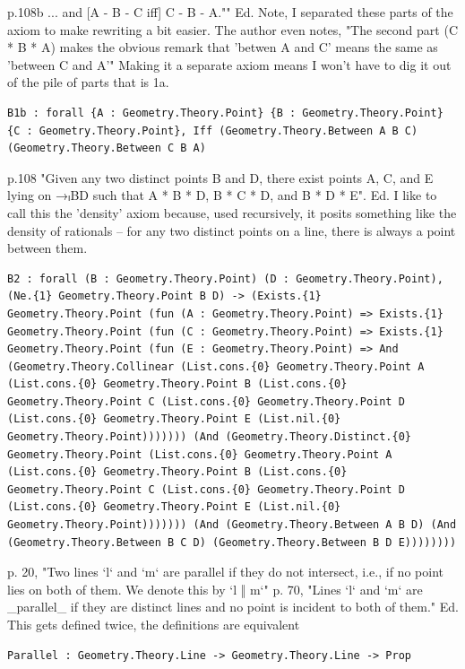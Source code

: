 \begin{lemma}
  \label{Geometry.Theory.B1b}
  \leanok
  p.108b ... and [A - B - C iff] C - B - A.""  Ed. Note, I separated these parts of the axiom to make rewriting a bit easier. The author even notes, "The second part (C * B * A) makes the obvious remark that 'betwen A and C' means the same as 'between C and A'" Making it a separate axiom means I won't have to dig it out of the pile of parts that is 1a. 
\begin{verbatim}B1b : forall {A : Geometry.Theory.Point} {B : Geometry.Theory.Point} {C : Geometry.Theory.Point}, Iff (Geometry.Theory.Between A B C) (Geometry.Theory.Between C B A)\end{verbatim}
\end{lemma}

\begin{lemma}
  \label{Geometry.Theory.B2}
  \leanok
  p.108 "Given any two distinct points B and D, there exist points A, C, and E lying on →ₗBD such that A * B * D, B * C * D, and B * D * E".  Ed. I like to call this the 'density' axiom because, used recursively, it posits something like the density of rationals -- for any two distinct points on a line, there is always a point between them. 
\begin{verbatim}B2 : forall (B : Geometry.Theory.Point) (D : Geometry.Theory.Point), (Ne.{1} Geometry.Theory.Point B D) -> (Exists.{1} Geometry.Theory.Point (fun (A : Geometry.Theory.Point) => Exists.{1} Geometry.Theory.Point (fun (C : Geometry.Theory.Point) => Exists.{1} Geometry.Theory.Point (fun (E : Geometry.Theory.Point) => And (Geometry.Theory.Collinear (List.cons.{0} Geometry.Theory.Point A (List.cons.{0} Geometry.Theory.Point B (List.cons.{0} Geometry.Theory.Point C (List.cons.{0} Geometry.Theory.Point D (List.cons.{0} Geometry.Theory.Point E (List.nil.{0} Geometry.Theory.Point))))))) (And (Geometry.Theory.Distinct.{0} Geometry.Theory.Point (List.cons.{0} Geometry.Theory.Point A (List.cons.{0} Geometry.Theory.Point B (List.cons.{0} Geometry.Theory.Point C (List.cons.{0} Geometry.Theory.Point D (List.cons.{0} Geometry.Theory.Point E (List.nil.{0} Geometry.Theory.Point))))))) (And (Geometry.Theory.Between A B D) (And (Geometry.Theory.Between B C D) (Geometry.Theory.Between B D E))))))))\end{verbatim}
\end{lemma}

\begin{definition}
  \label{Geometry.Theory.Parallel}
  \leanok
  p. 20, "Two lines `l` and `m` are parallel if they do not intersect, i.e., if no point lies on both of them. We denote this by `l ‖ m`"  p. 70, "Lines `l` and `m` are _parallel_ if they are distinct lines and no point is incident to both of them."  Ed. This gets defined twice, the definitions are equivalent 
\begin{verbatim}Parallel : Geometry.Theory.Line -> Geometry.Theory.Line -> Prop\end{verbatim}
\end{definition}

